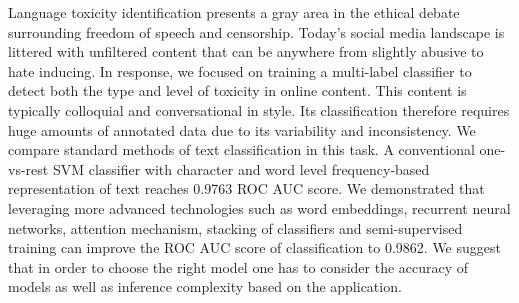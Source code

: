 Language toxicity identification presents a gray area in the ethical debate surrounding freedom of speech and censorship. Today's social media landscape is littered with unfiltered content that can be anywhere from slightly abusive to hate inducing. In response, we focused on training a multi-label classifier to detect both the type and level of toxicity in online content. This content is typically colloquial and conversational in style. Its classification therefore requires huge amounts of annotated data due to its variability and inconsistency.  We compare standard methods of text classification in this task. A conventional one-vs-rest SVM classifier with character and word level frequency-based representation of text reaches 0.9763 ROC AUC score. We demonstrated that leveraging more advanced technologies such as word embeddings, recurrent neural networks, attention mechanism, stacking of classifiers and semi-supervised training can improve the ROC AUC score of classification to 0.9862. We suggest that in order to choose the right model one has to consider the accuracy of models as well as inference complexity based on the application.
